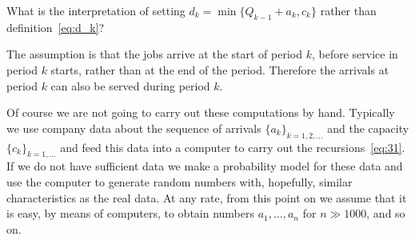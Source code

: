 \begin{exercise}
 What is the interpretation of setting
    $d_k = \min\{Q_{k-1}+a_k,  c_k\}$ rather than definition~\eqref{eq:d_k}?
\begin{solution}
 The assumption is that the jobs arrive at the start of period
    $k$, before service in period $k$ starts, rather than at the end
    of the period. Therefore the arrivals at period $k$ can also be
    served during period $k$.
\end{solution}
\end{exercise}


Of course we are not going to carry out these computations by
hand. Typically we use company data about the sequence of arrivals
$\{a_k\}_{k=1,2,\ldots}$ and the capacity $\{c_k\}_{k=1,\ldots}$ and
feed this data into a computer to carry out the
recursions~\eqref{eq:31}. If we do not have sufficient data we make a
probability model for these data and use the computer to generate
random numbers with, hopefully, similar characteristics as the real
data. At any rate, from this point on we assume that it is easy, by
means of computers, to obtain numbers $a_1,\ldots, a_n$ for
$n\gg 1000$, and so on.


